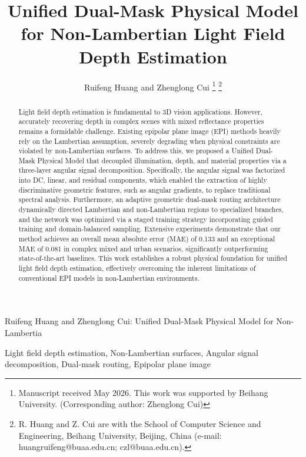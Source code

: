 \documentclass[lettersize,journal]{IEEEtran}
\begin{document}
\title{Unified Dual-Mask Physical Model for Non-Lambertian Light Field Depth Estimation}

\author{Ruifeng Huang and Zhenglong Cui
\thanks{Manuscript received May 2026. This work was supported by Beihang University. (Corresponding author: Zhenglong Cui)}
\thanks{R. Huang and Z. Cui are with the School of Computer Science and Engineering, Beihang University, Beijing, China (e-mail: huangruifeng@buaa.edu.cn; czl@buaa.edu.cn).}}

%
{Ruifeng Huang and Zhenglong Cui: Unified Dual-Mask Physical Model for Non-Lambertia}

\maketitle

\begin{abstract}
Light field depth estimation is fundamental to 3D vision applications. However, accurately recovering depth in complex scenes with mixed reflectance properties remains a formidable challenge. Existing epipolar plane image (EPI) methods heavily rely on the Lambertian assumption, severely degrading when physical constraints are violated by non-Lambertian surfaces. To address this, we proposed a Unified Dual-Mask Physical Model that decoupled illumination, depth, and material properties via a three-layer angular signal decomposition. Specifically, the angular signal was factorized into DC, linear, and residual components, which enabled the extraction of highly discriminative geometric features, such as angular gradients, to replace traditional spectral analysis. Furthermore, an adaptive geometric dual-mask routing architecture dynamically directed Lambertian and non-Lambertian regions to specialized branches, and the network was optimized via a staged training strategy incorporating guided training and domain-balanced sampling. Extensive experiments demonstrate that our method achieves an overall mean absolute error (MAE) of 0.133 and an exceptional MAE of 0.081 in complex mixed and urban scenarios, significantly outperforming state-of-the-art baselines. This work establishes a robust physical foundation for unified light field depth estimation, effectively overcoming the inherent limitations of conventional EPI models in non-Lambertian environments.
\end{abstract}

\begin{IEEEkeywords}
Light field depth estimation, Non-Lambertian surfaces, Angular signal decomposition, Dual-mask routing, Epipolar plane image
\end{IEEEkeywords}
\end{document}

